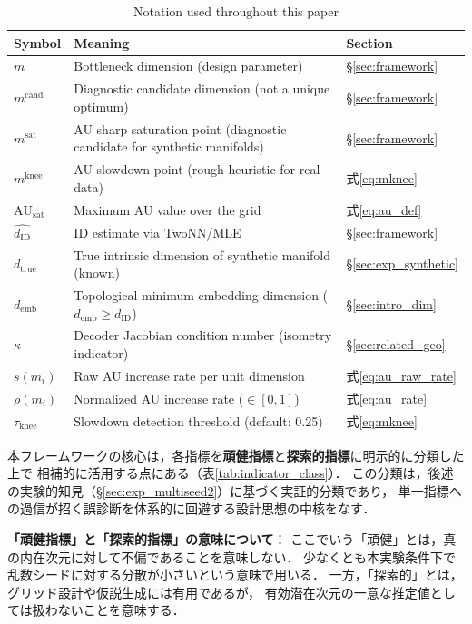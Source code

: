 \documentclass[11pt,a4paper]{jsarticle}
\newcommand{\dID}{d_{\mathrm{ID}}}
\newcommand{\dzopt}{m^{\mathrm{cand}}}
\newcommand{\dtrue}{d_{\mathrm{true}}}
\newcommand{\kap}{\kappa}
\newcommand{\AUsat}{\mathrm{AU}_{\mathrm{sat}}}
\newcommand{\dzsat}{m^{\mathrm{sat}}}
\newcommand{\mknee}{m^{\mathrm{knee}}}
\newcommand{\demb}{d_{\mathrm{emb}}}
\begin{document}
\begin{table}[H]
\centering
\caption{Notation used throughout this paper}
\label{tab:notation}
\small
\begin{tabular}{lll}
\toprule
Symbol & Meaning & Section \\
\midrule
$m$ & Bottleneck dimension (design parameter) & §\ref{sec:framework} \\
$\dzopt$ & Diagnostic candidate dimension (not a unique optimum) & §\ref{sec:framework} \\
$\dzsat$ & AU sharp saturation point (diagnostic candidate for synthetic manifolds) & §\ref{sec:framework} \\
$\mknee$ & AU slowdown point (rough heuristic for real data) & 式\eqref{eq:mknee} \\
$\AUsat$ & Maximum AU value over the grid & 式\eqref{eq:au_def} \\
$\hat{\dID}$ & ID estimate via TwoNN/MLE & §\ref{sec:framework} \\
$\dtrue$ & True intrinsic dimension of synthetic manifold (known) & §\ref{sec:exp_synthetic} \\
$\demb$ & Topological minimum embedding dimension ($\demb \geq \dID$) & §\ref{sec:intro_dim} \\
$\kap$ & Decoder Jacobian condition number (isometry indicator) & §\ref{sec:related_geo} \\
$s(m_i)$ & Raw AU increase rate per unit dimension & 式\eqref{eq:au_raw_rate} \\
$\rho(m_i)$ & Normalized AU increase rate ($\in[0,1]$) & 式\eqref{eq:au_rate} \\
$\tau_{\mathrm{knee}}$ & Slowdown detection threshold (default: 0.25) & 式\eqref{eq:mknee} \\
\bottomrule
\end{tabular}
\end{table}

本フレームワークの核心は，各指標を\textbf{頑健指標}と\textbf{探索的指標}に明示的に分類した上で
相補的に活用する点にある（表\ref{tab:indicator_class}）．
この分類は，後述の実験的知見（§\ref{sec:exp_multiseed2}）に基づく実証的分類であり，
単一指標への過信が招く誤診断を体系的に回避する設計思想の中核をなす．

\textbf{「頑健指標」と「探索的指標」の意味について}：
ここでいう「頑健」とは，真の内在次元に対して不偏であることを意味しない．
少なくとも本実験条件下で乱数シードに対する分散が小さいという意味で用いる．
一方，「探索的」とは，グリッド設計や仮説生成には有用であるが，
有効潜在次元の一意な推定値としては扱わないことを意味する．
\end{document}
